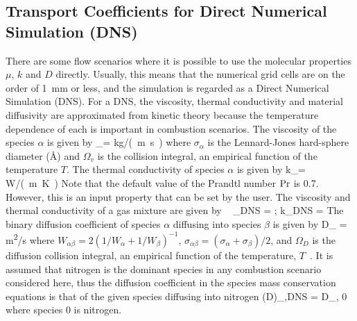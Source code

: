 \subsection{Transport Coefficients for Direct Numerical Simulation (DNS)}
\label{DNS}

There are some flow scenarios where it is possible to use the molecular properties
$\mu$, $k$ and $D$ directly. Usually, this means that the numerical grid cells are on the
order of 1~mm or less, and the simulation is regarded as a
Direct Numerical Simulation (DNS).
For a DNS, the viscosity, thermal conductivity
and material diffusivity are approximated from kinetic theory because the temperature
dependence of each is important in combustion scenarios.
The viscosity of the species $\alpha$ is given by
\be \mu_\alpha = 
\quad [=] \quad \si{kg/(m.s)} \ee
where $\sigma_\alpha$ is the Lennard-Jones
hard-sphere diameter ($\text{\AA}$) and $\Omega_v$ is the
collision integral, an empirical function of the
temperature $T$. The thermal conductivity of species $\alpha$ is given by
\be k_\alpha =   \quad [=] \quad \si{W/(m.K)} \ee
Note that the default value of the Prandtl number $\hbox{Pr}$ is 0.7.  However, this is an input property that can be set by the user.
The viscosity and thermal conductivity of a gas mixture are given by  ~\cite{Davidson:1993}
\be \mu_{\hbox{\tiny DNS}} =   \quad ; \quad k_{\hbox{\tiny DNS}} =   \ee
The binary diffusion coefficient of species $\alpha$
diffusing into species $\beta$ is given by
\be D_{\alpha \beta} = 
\quad [=] \quad \si{m^2/s} \ee
where $W_{\alpha \beta}=2(1/W_\alpha+1/W_\beta)^{-1}$, $\sigma_{\alpha \beta}=(\sigma_\alpha+\sigma_\beta)/2$, and
$\Omega_D$ is the diffusion collision integral, an empirical
function of the temperature, $T$~\cite{Poling:1}.
It is assumed that nitrogen is the dominant species in any combustion
scenario considered here, thus the diffusion coefficient in the
species mass conservation equations is that of the given species diffusing
into nitrogen
\be (\rho D)_{\alpha,\hbox{\tiny DNS}} = \rho \;  D_{\alpha, 0} \ee
where species 0 is nitrogen.

\newpage

